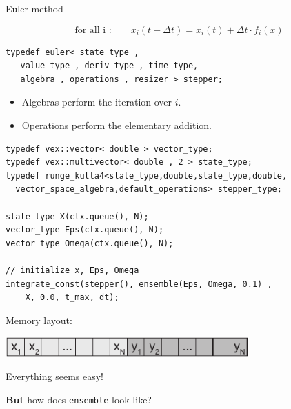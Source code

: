 







\begin{frame}[fragile]


 \vspace{2ex}

Euler method

$$\text{for all i :}  \quad \quad x_i(t+\Delta t) = x_i(t) + \Delta t \cdot f_i(x)$$

\vspace{2ex}

\begin{lstlisting}
typedef euler< state_type ,
   value_type , deriv_type , time_type,
   algebra , operations , resizer > stepper; 
\end{lstlisting}


\begin{itemize}
\item Algebras perform the iteration over $i$.
\item Operations perform the elementary addition.
\end{itemize}


\end{frame}




\begin{frame}[fragile]


 \begin{lstlisting}[basicstyle=\scriptsize\ttfamily]
typedef vex::vector< double > vector_type;
typedef vex::multivector< double , 2 > state_type;
typedef runge_kutta4<state_type,double,state_type,double,
  vector_space_algebra,default_operations> stepper_type;

state_type X(ctx.queue(), N);
vector_type Eps(ctx.queue(), N);
vector_type Omega(ctx.queue(), N);

// initialize x, Eps, Omega
integrate_const(stepper(), ensemble(Eps, Omega, 0.1) ,
    X, 0.0, t_max, dt);
 \end{lstlisting}

\vspace{2ex}

\centerline{Memory layout:}

\vspace{1ex}

\centerline{\includegraphics[draft=false,width=0.7\textwidth]{memory_layout2.pdf}}

\vspace{2ex}

\centerline{Everything seems easy!}
\vspace{2ex}
\centerline{{\bf But} how does {\tt ensemble} look like?}
 

\end{frame}




